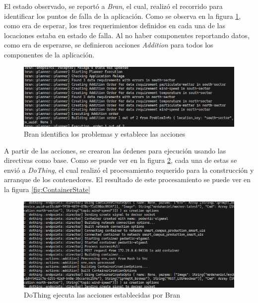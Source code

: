 El estado observado, se reportó a \textit{Bran}, el cual, realizó el recorrido para identificar los puntos de falla de la aplicación. Como se observa en la figura \ref{fig:BranPlan}, como era de esperar, los tres requerimientos definidos en cada una de las locaciones estaba en estado de falla. Al no haber componentes reportando datos, como era de esperarse, se definieron acciones \textit{Addition} para todos los componentes de la aplicación. 

\begin{figure}[ht]
    \centering
    \caption{Bran identifica los problemas y establece las acciones}
    \label{fig:BranPlan}
    \includegraphics[width=0.9\linewidth]{images/BranPlanning.png}
    \vspace{-4mm}
\end{figure}

A partir de las acciones, se crearon las órdenes para ejecución usando las directivas como base. Como se puede ver en la figura \ref{fig:DoThingDoing}, cada una de estas se envió a \textit{DoThing}, el cual realizó el procesamiento requerido para la construcción y arranque de los contenedores. El resultado de este procesamiento se puede ver en la figura \ref{fig:ContainerState}

\begin{figure}[ht]
    \centering
    \caption{DoThing ejecuta las acciones establecidas por Bran }
    \label{fig:DoThingDoing}
    \includegraphics[width=0.9\linewidth]{images/DoThingDoing.png}
    \vspace{-4mm}
\end{figure}

